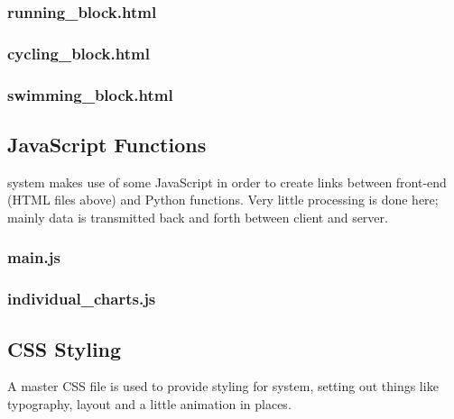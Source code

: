 \documentclass{article}[12pt,a4paper]
\begin{document}
\subsubsection{running\_block.html}


\subsubsection{cycling\_block.html}


\subsubsection{swimming\_block.html}



\subsection{JavaScript Functions}
system makes use of some JavaScript in order to create links between front-end (HTML files above) and Python functions. Very little processing is done here; mainly data is transmitted back and forth between client and server.

\subsubsection{main.js}


\subsubsection{individual\_charts.js}



\subsection{CSS Styling}
A master CSS file is used to provide styling for system, setting out things like typography, layout and a little animation in places.


\end{document}
